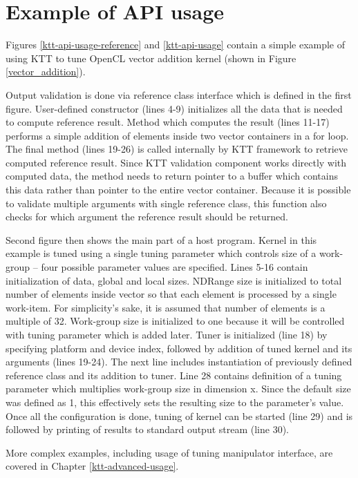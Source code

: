 \documentclass
[
    digital, %
    oneside, %
    table, %
    nolof, %
    nolot, %
    nocover %
]{fithesis3}
\begin{document}
\section{Example of API usage}
\label{ktt-simple-usage}
Figures \ref{ktt-api-usage-reference} and \ref{ktt-api-usage} contain a simple example of using KTT to tune OpenCL vector addition kernel (shown in
Figure \ref{vector_addition}).

Output validation is done via reference class interface which is defined in the first figure. User-defined constructor (lines 4-9) initializes all
the data that is needed to compute reference result. Method which computes the result (lines 11-17) performs a simple addition of elements inside
two vector containers in a for loop. The final method (lines 19-26) is called internally by KTT framework to retrieve computed reference result.
Since KTT validation component works directly with computed data, the method needs to return pointer to a buffer which contains this data rather than
pointer to the entire vector container. Because it is possible to validate multiple arguments with single reference class, this function also checks
for which argument the reference result should be returned.

Second figure then shows the main part of a host program. Kernel in this example is tuned using a single tuning parameter which controls size of a
work-group -- four possible parameter values are specified. Lines 5-16 contain initialization of data, global and local sizes. NDRange size is
initialized to total number of elements inside vector so that each element is processed by a single work-item. For simplicity's sake, it is assumed that
number of elements is a multiple of 32. Work-group size is initialized to one because it will be controlled with tuning parameter which is added later.
Tuner is initialized (line 18) by specifying platform and device index, followed by addition of tuned kernel and its arguments (lines 19-24). The next
line includes instantiation of previously defined reference class and its addition to tuner. Line 28 contains definition of a tuning parameter which
multiplies work-group size in dimension x. Since the default size was defined as 1, this effectively sets the resulting size to the parameter's value.
Once all the configuration is done, tuning of kernel can be started (line 29) and is followed by printing of results to standard output stream (line 30).

More complex examples, including usage of tuning manipulator interface, are covered in Chapter \ref{ktt-advanced-usage}.
\end{document}
